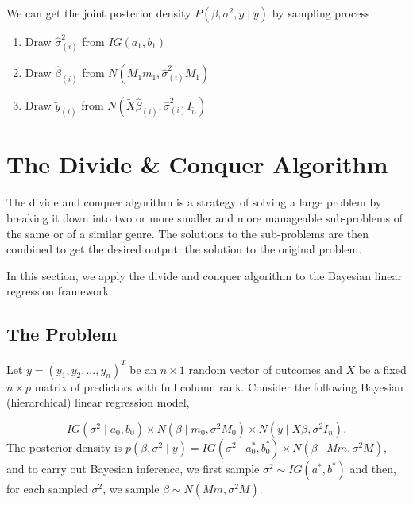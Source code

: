 \documentclass[
]{book}
\theoremstyle{definition}
\theoremstyle{definition}
\theoremstyle{definition}
\theoremstyle{definition}
\theoremstyle{remark}
\begin{document}
We can get the joint posterior density \(P\left(\beta, \sigma^{2}, \tilde{y} \mid y\right)\) by sampling process

\begin{enumerate}
\def\labelenumi{\arabic{enumi})}
\item
  Draw \(\hat{\sigma}_{(i)}^{2}\) from \(I G\left(a_{1}, b_{1}\right)\)
\item
  Draw \(\hat{\beta}_{(i)}\) from \(N\left(M_{1} m_{1}, \hat{\sigma}_{(i)}^{2} M_{1}\right)\)
\item
  Draw \(\tilde{y}_{(i)}\) from \(N\left(\tilde{X} \hat{\beta}_{(i)}, \hat{\sigma}_{(i)}^{2}I_{\tilde{n}}\right)\)
\end{enumerate}

\hypertarget{the-divide-conquer-algorithm}{%
\chapter{The Divide \& Conquer Algorithm}\label{the-divide-conquer-algorithm}}

The divide and conquer algorithm is a strategy of solving a large problem by breaking it down into two or more smaller and more manageable sub-problems of the same or of a similar genre. The solutions to the sub-problems are then combined to get the desired output: the solution to the original problem.

In this section, we apply the divide and conquer algorithm to the Bayesian linear regression framework.

\hypertarget{the-problem}{%
\section{The Problem}\label{the-problem}}

Let \(y = (y_1, y_2, ...,y_n)^{T}\) be an \(n \times 1\) random vector of outcomes and \(X\) be a fixed \(n \times p\) matrix of predictors with full column rank. Consider the following Bayesian (hierarchical) linear regression model,

\[ IG(\sigma^2 \mid a_0,b_0) \times N(\beta \mid m_0, \sigma^2M_0) \times N(y \mid X\beta, \sigma^2I_n).\]
The posterior density is \(p(\beta, \sigma^2 \mid y) = IG(\sigma^2 \mid a_0^*, b_0^*) \times N(\beta \mid Mm, \sigma^2M)\), and to carry out Bayesian inference, we first sample \(\sigma^2 \sim IG(a^*, b^*)\) and then, for each sampled \(\sigma^2\), we sample \(\beta \sim N(Mm, \sigma^2 M)\).
\end{document}
